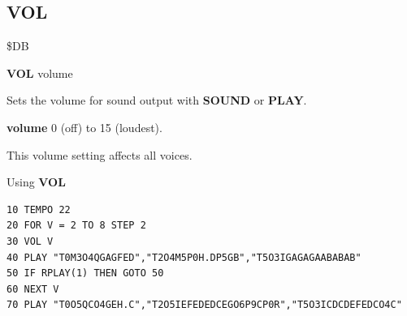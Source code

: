 \subsection{VOL}
\begin{description}[leftmargin=2cm,style=nextline]
\item [Token:] \$DB
\item [Format:] {\bf VOL} volume
\item [Usage:] Sets the volume for sound output with
               {\bf SOUND} or {\bf PLAY}.

               {\bf volume} 0 (off) to 15 (loudest).

\item [Remarks:] This volume setting affects all voices.

\item [Example:] Using {\bf VOL}
\begin{tcolorbox}[colback=black,coltext=white]
\verbatimfont{\codefont}
\begin{verbatim}
10 TEMPO 22
20 FOR V = 2 TO 8 STEP 2
30 VOL V
40 PLAY "T0M3O4QGAGFED","T2O4M5P0H.DP5GB","T5O3IGAGAGAABABAB"
50 IF RPLAY(1) THEN GOTO 50
60 NEXT V
70 PLAY "T0O5QCO4GEH.C","T2O5IEFEDEDCEGO6P9CP0R","T5O3ICDCDEFEDCO4C"
\end{verbatim}
\end{tcolorbox}
\end{description}


\newpage
